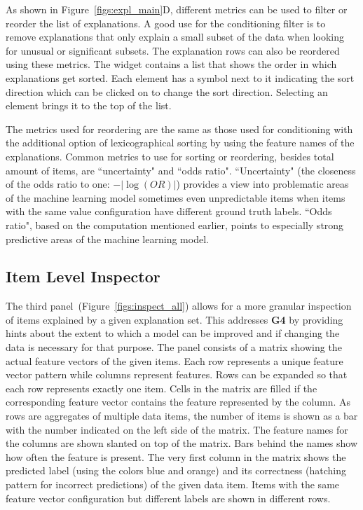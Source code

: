 As shown in Figure~\ref{figs:expl_main}D, different metrics can be used to filter or reorder the list of explanations.  
A good use for the conditioning filter is to remove explanations that only explain a small subset of the data when looking for unusual or significant subsets.
The explanation rows can also be reordered using these metrics. 
The widget contains a list that shows the order in which explanations get sorted.
Each element has a symbol next to it indicating the sort direction which can be clicked on to change the sort direction.
Selecting an element brings it to the top of the list.

The metrics used for reordering are the same as those used for conditioning with the additional option of lexicographical sorting by using the feature names of the explanations.
Common metrics to use for sorting or reordering, besides total amount of items, are ``uncertainty" and ``odds ratio".
``Uncertainty" (the closeness of the odds ratio to one: $-| \log{(OR)} |$) provides a view into problematic areas of the machine learning model sometimes even unpredictable items when items with the same value configuration have different ground truth labels.
``Odds ratio", based on the computation mentioned earlier, points to especially strong predictive areas of the machine learning model.

\subsection{Item Level Inspector}
\label{sec:item_level}
The third panel~(Figure~\ref{figs:inspect_all}) allows for a more granular inspection of items explained by a given explanation set. This addresses \textbf{G4} by providing hints about the extent to which a model can be improved and if changing the data is necessary for that purpose.
The panel consists of a matrix showing the actual feature vectors of the given items.
Each row represents a unique feature vector pattern while columns represent features.
Rows can be expanded so that each row represents exactly one item.
Cells in the matrix are filled if the corresponding feature vector contains the feature represented by the column.
As rows are aggregates of multiple data items, the number of items is shown as a bar with the number indicated on the left side of the matrix.
The feature names for the columns are shown slanted on top of the matrix.
Bars behind the names show how often the feature is present.
The very first column in the matrix shows the predicted label (using the colors blue and orange) and its correctness (hatching pattern for incorrect predictions) of the given data item.
Items with the same feature vector configuration but different labels are shown in different rows.

